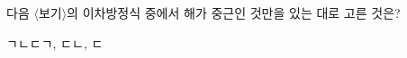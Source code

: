다음 $\langle$보기$\rangle$의 이차방정식 중에서 해가 중근인 것만을 있는 대로 고른 것은?
\begin{choices32}{ㄱ}{ㄴ}{ㄷ}{ㄱ, ㄷ}{ㄴ, ㄷ}\end{choices32}
